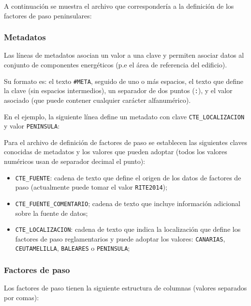 \documentclass[10pt,notitlepage,oneside,a4paper]{article}
\begin{document}
A continuación se muestra el archivo que correspondería a la definición de los factores de paso peninsulares:



\subsubsection{Metadatos}

Las líneas de metadatos asocian un valor a una clave y permiten asociar datos al conjunto de componentes energéticos (p.e el área de referencia del edificio).

Su formato es: el texto \texttt{\#META}, seguido de uno o más espacios, el texto que define la clave (sin espacios intermedios), un separador de dos puntos (\texttt{:}), y el valor asociado (que puede contener cualquier carácter alfanumérico).

En el ejemplo, la siguiente línea define un metadato con clave \texttt{CTE\_LOCALIZACION} y valor \texttt{PENINSULA}:



Para el archivo de definición de factores de paso se establecen las siguientes claves conocidas de metadatos y los valores que pueden adoptar (todos los valores numéricos usan de separador decimal el punto):

\begin{itemize}
    \item \texttt{CTE\_FUENTE}: cadena de texto que define el origen de los datos de factores de paso (actualmente puede tomar el valor \texttt{RITE2014});
    \item \texttt{CTE\_FUENTE\_COMENTARIO}; cadena de texto que incluye información adicional sobre la fuente de datos;
    \item \texttt{CTE\_LOCALIZACION}: cadena de texto que indica la localización que define los factores de paso reglamentarios y puede adoptar los valores: \texttt{CANARIAS}, \texttt{CEUTAMELILLA}, \texttt{BALEARES} o \texttt{PENINSULA};
\end{itemize}

\subsubsection{Factores de paso}

Los factores de paso tienen la siguiente estructura de columnas (valores separados por comas):
\end{document}
